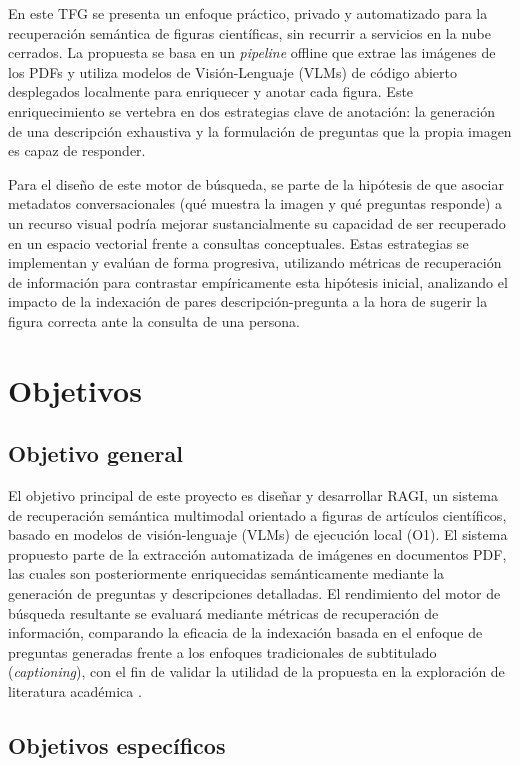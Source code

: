 \documentclass[a4paper]{report}
\begin{document}
En este TFG se presenta un enfoque práctico, privado y automatizado para la recuperación semántica de figuras científicas, sin recurrir a servicios en la nube cerrados. La propuesta se basa en un \textit{pipeline} offline que extrae las imágenes de los PDFs y utiliza modelos de Visión-Lenguaje (VLMs) de código abierto desplegados localmente para enriquecer y anotar cada figura. Este enriquecimiento se vertebra en dos estrategias clave de anotación: la generación de una descripción exhaustiva y la formulación de preguntas que la propia imagen es capaz de responder.

Para el diseño de este motor de búsqueda, se parte de la hipótesis de que asociar metadatos conversacionales (qué muestra la imagen y qué preguntas responde) a un recurso visual podría mejorar sustancialmente su capacidad de ser recuperado en un espacio vectorial frente a consultas conceptuales. Estas estrategias se implementan y evalúan de forma progresiva, utilizando métricas de recuperación de información para contrastar empíricamente esta hipótesis inicial, analizando el impacto de la indexación de pares descripción-pregunta a la hora de sugerir la figura correcta ante la consulta de una persona.

\section{Objetivos}
\label{sec:objetivos}

\subsection{Objetivo general}

El objetivo principal de este proyecto es diseñar y desarrollar RAGI, un sistema de recuperación semántica multimodal orientado a figuras de artículos científicos, basado en modelos de visión-lenguaje (VLMs) de ejecución local (O1). El sistema propuesto parte de la extracción automatizada de imágenes en documentos PDF, las cuales son posteriormente enriquecidas semánticamente mediante la generación de preguntas y descripciones detalladas. El rendimiento del motor de búsqueda resultante se evaluará mediante métricas de recuperación de información, comparando la eficacia de la indexación basada en el enfoque de preguntas generadas frente a los enfoques tradicionales de subtitulado (\textit{captioning}), con el fin de validar la utilidad de la propuesta en la exploración de literatura académica \cite{li2022blip}.

\subsection{Objetivos específicos}
\end{document}
